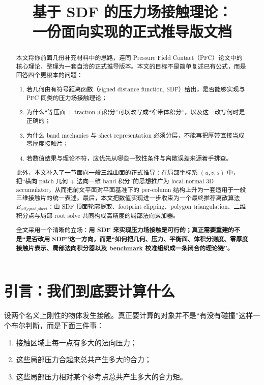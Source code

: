 \documentclass[12pt,a4paper]{ctexart}
\title{基于 SDF 的压力场接触理论：\\
一份面向实现的正式推导版文档}
\author{}
\date{}
\begin{document}
\maketitle

\begin{abstract}
本文将你前面几份补充材料中的思路，连同 Pressure Field Contact（PFC）论文中的核心理论，整理为一套自洽的正式推导版本。本文的目标不是简单复述已有公式，而是回答四个更根本的问题：
\begin{enumerate}
    \item 若几何由有符号距离函数（signed distance function, SDF）给出，是否能够实现与 PFC 同类的压力场接触理论；
    \item 为什么“等压面 + traction 面积分”可以改写成“窄带体积分”，以及这一改写何时是正确的；
    \item 为什么 band mechanics 与 sheet representation 必须分层，不能再把厚带直接当成零厚度接触片；
    \item 若数值结果与理论不符，应优先从哪些一致性条件与离散误差来源着手排查。
\end{enumerate}

此外，本文补入了一节面向一般三维曲面的正式推导：在局部坐标系 $(u,v,s)$ 中，把“横向 patch 几何 + 法向一维 band 积分”的思想推广为 local-normal 3D accumulator，从而把前文平面对平面基准下的 per-column 结构上升为一套适用于一般三维接触片的统一表述。最后，本文把数值实现进一步收束为一个最终推荐离散算法 $B_{\mathrm{sdf\_quad\_sheet}}$：由 SDF 顶面轮廓提取、footprint clipping、polygon triangulation、二维积分点与局部 root solve 共同构成高精度的局部法向累加器。

全文采用一个清晰的立场：\textbf{用 SDF 来实现压力场接触是可行的；真正需要重建的不是“是否改用 SDF”这一方向，而是“如何把几何、压力、平衡面、体积分测度、零厚度接触片表示、局部法向积分器以及 benchmark 校准组织成一条闭合的理论链”。}
\end{abstract}

\tableofcontents

\section{引言：我们到底要计算什么}

设两个名义上刚性的物体发生接触。真正要计算的对象并不是“有没有碰撞”这样一个布尔判断，而是下面三件事：
\begin{enumerate}
    \item 接触区域上每一点有多大的法向压力；
    \item 这些局部压力合起来总共产生多大的合力；
    \item 这些局部压力相对某个参考点总共产生多大的合力矩。
\end{enumerate}
\end{document}
